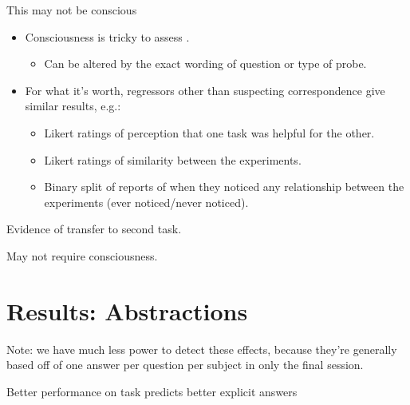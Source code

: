 \documentclass{beamer}
\begin{document}
\begin{frame}{This may not be conscious}
\begin{itemize}
\item Consciousness is tricky to assess \citep{Newell2014}.
    \begin{itemize}
    \item<2-> Can be altered by the exact wording of question or type of probe.
    \end{itemize}
\item<3-> For what it's worth, regressors other than suspecting correspondence give similar results, e.g.:
    \begin{itemize}
    \item<4-> Likert ratings of perception that one task was helpful for the other. 
    \item<5-> Likert ratings of similarity between the experiments.
    \item<6-> Binary split of reports of when they noticed any relationship between the experiments (ever noticed/never noticed).
    \end{itemize}
\end{itemize}
\end{frame}

\begin{frame}[standout]
Evidence of transfer to second task. \par
{} {
May not require consciousness.
}
\end{frame}
\section{Results: Abstractions}


\begin{frame}
Note: we have much less power to detect these effects, because they're generally based off of one answer per question per subject in only the final session.
\end{frame}

\begin{frame}{Better performance on task predicts better explicit answers}
\begin{figure}
\centering
{} 
\end{figure}
\end{frame}
\end{document}
